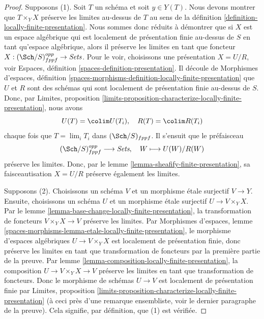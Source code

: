 \begin{proof}
Supposons (1). Soit $T$ un schéma et soit $y \in Y(T)$. Nous devons montrer que
$T \times_Y X$ préserve les limites au-dessus de $T$ au sens de
la définition \ref{definition-locally-finite-presentation}.
Nous sommes donc réduits à démontrer que si $X$ est un espace algébrique qui
est localement de présentation finie au-dessus de $S$ en tant qu'espace algébrique, alors il
préserve les limites en tant que foncteur
$X : (\Sch/S)_{fppf}^{opp} \to \textit{Sets}$.
Pour le voir, choisissons une présentation $X = U/R$, voir
Espaces, définition \ref{spaces-definition-presentation}.
Il découle de
Morphismes d'espaces,
définition \ref{spaces-morphisms-definition-locally-finite-presentation}
que $U$ et $R$ sont des schémas qui sont localement de présentation finie
au-dessus de $S$. Donc, par
Limites, proposition
\ref{limits-proposition-characterize-locally-finite-presentation},
nous avons
$$
U(T) = \colim U(T_i), \quad
R(T) = \colim R(T_i)
$$
chaque fois que $T = \lim_i T_i$ dans $(\Sch/S)_{fppf}$. Il s'ensuit
que le préfaisceau
$$
(\Sch/S)_{fppf}^{opp} \longrightarrow \textit{Sets}, \quad
W \longmapsto U(W)/R(W)
$$
préserve les limites. Donc, par le
lemme \ref{lemma-sheafify-finite-presentation},
sa faisceautisation $X = U/R$ préserve également les limites.

\medskip\noindent
Supposons (2). Choisissons un schéma $V$ et un morphisme \'etale surjectif
$V \to Y$. Ensuite, choisissons un schéma $U$ et un morphisme \'etale surjectif
$U \to V \times_Y X$. Par le
lemme \ref{lemma-base-change-locally-finite-presentation}, la transformation de foncteurs
$V \times_Y X \to V$ préserve les limites. Par
Morphismes d'espaces,
lemme \ref{spaces-morphisms-lemma-etale-locally-finite-presentation},
le morphisme d'espaces algébriques $U \to V \times_Y X$ est localement
de présentation finie, donc préserve les limites en tant que
transformation de foncteurs par la première partie de la preuve. Par
lemme \ref{lemma-composition-locally-finite-presentation},
la composition $U \to V \times_Y X \to V$ préserve les limites
en tant que transformation de foncteurs. Donc
le morphisme de schémas $U \to V$ est localement de présentation finie par
Limites, proposition
\ref{limits-proposition-characterize-locally-finite-presentation}
(à ceci près d'une remarque ensembliste, voir le dernier paragraphe de la preuve).
Cela signifie, par définition, que (1) est vérifiée.


\end{proof}

